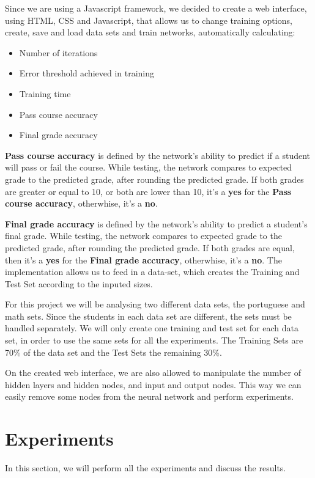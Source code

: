 \documentclass[11pt]{article}
\begin{document}
Since we are using a Javascript framework, we decided to create a web interface, using HTML, CSS and Javascript, that allows us to change training options, create, save and load data sets  and train networks, automatically calculating:

\begin{itemize}
\item Number of iterations
\item Error threshold achieved in training
\item Training time
\item Pass course accuracy
\item Final grade accuracy
\end{itemize}

\textbf{Pass course accuracy} is defined by the network's ability to predict if a student will pass or fail the course. While testing, the network compares to expected grade to the predicted grade, after rounding the predicted grade. If both grades are greater or equal to 10, or both are lower than 10, it's a \textbf{yes} for the \textbf{Pass course accuracy}, otherwhise, it's a \textbf{no}.

\textbf{Final grade accuracy} is defined by the network's ability to predict a student's final grade. While testing, the network compares to expected grade to the predicted grade, after rounding the predicted grade. If both grades are equal, then it's a \textbf{yes} for the \textbf{Final grade accuracy}, otherwhise, it's a \textbf{no}.
\hfill \break
\hfill \break
The implementation allows us to feed in a data-set, which creates the Training and Test Set according to the inputed sizes.

For this project we will be analysing two different data sets, the portuguese and math sets. Since the students in each data set are different, the sets must be handled separately. We will only create one training and test set for each data set, in order to use the same sets for all the experiments. The Training Sets are 70\% of the data set and the Test Sets the remaining 30\%.

On the created web interface, we are also allowed to manipulate the number of hidden layers and hidden nodes, and input and output nodes. This way we can easily remove some nodes from the neural network and perform experiments.

\section{Experiments}
In this section, we will perform all the experiments and discuss the results.
\end{document}

